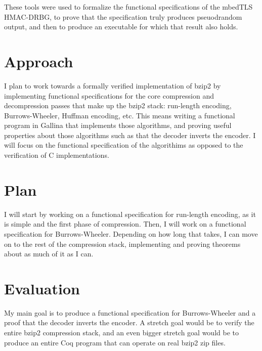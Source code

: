 \documentclass{article}
\begin{document}
These tools were used to formalize the functional specifications of
the mbedTLS HMAC-DRBG, to prove that the specification truly produces
pseuodrandom output, and then to produce an executable for which that
result also holds\cite{Ye:2017:VCS:3133956.3133974}.

\section{Approach}
I plan to work towards a formally verified implementation of bzip2 by
implementing functional specifications for the core compression and
decompression passes that make up the bzip2 stack: run-length
encoding, Burrows-Wheeler, Huffman encoding, etc. This means writing a
functional program in Gallina that implements those algorithms, and
proving useful properties about those algorithms such as that the
decoder inverts the encoder. I will focus on the functional
specification of the algorithims as opposed to the verification of C
implementations.

\section{Plan}
I will start by working on a functional specification for run-length
encoding, as it is simple and the first phase of compression. Then, I
will work on a functional specification for Burrows-Wheeler. Depending
on how long that takes, I can move on to the rest of the compression
stack, implementing and proving theorems about as much of it as I can.

\section{Evaluation}
My main goal is to produce a functional specification for
Burrows-Wheeler and a proof that the decoder inverts the encoder. A
stretch goal would be to verify the entire bzip2 compression stack,
and an even bigger stretch goal would be to produce an entire Coq
program that can operate on real bzip2 zip files.

\printbibliography{}
\end{document}
